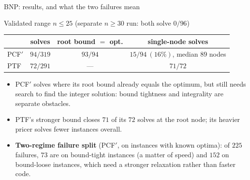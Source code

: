\documentclass[10pt]{beamer}
\begin{document}
\begin{frame}{BNP: results, and what the two failures mean}
\begin{block}{Validated range $n\le25$ \quad(separate $n\ge30$ run: both solve $0/96$)}
\centering
\begin{tabular}{lccc}
\toprule
 & solves & root bound $=$ opt. & single-node solves\\
\midrule
PCF$'$ & $94/319$ & $93/94$ & $15/94\ (16\%)$, median $89$ nodes\\
PTF    & $72/291$ & --- & $71/72$\\
\bottomrule
\end{tabular}
\end{block}
\begin{itemize}
  \item PCF$'$ solves where its root bound already equals the optimum, but still needs
        search to find the integer solution: bound tightness and integrality are separate
        obstacles.
  \item PTF's stronger bound closes $71$ of its $72$ solves at the root node; its
        heavier pricer solves fewer instances overall.
  \item \textbf{Two-regime failure split} (PCF$'$, on instances with known optima):
        of $225$ failures, $73$ are on bound-tight instances (a matter of speed) and
        $152$ on bound-loose instances, which need a stronger relaxation rather than
        faster code.
\end{itemize}
\end{frame}

\end{document}
